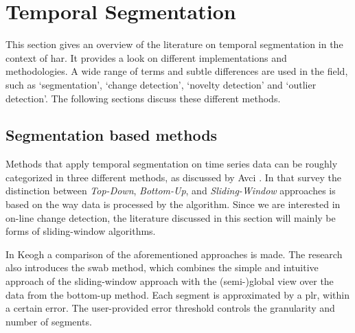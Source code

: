 \section{Temporal Segmentation}\label{sec:literature_review_temporal_segmentation}




This section gives an overview of the literature on temporal segmentation in the context of \gls{har}.
It provides a look on different implementations and methodologies.
A wide range of terms and subtle differences are used in the field, such as `segmentation', `change detection', `novelty detection' and `outlier detection'.
The following sections discuss these different methods.

\subsection{Segmentation based methods}\label{subsec:segmentation}

Methods that apply temporal segmentation on time series data can be roughly categorized in three different methods, as discussed by Avci \etal \cite{avci2010activity}.
In that survey the distinction between \emph{Top-Down}, \emph{Bottom-Up}, and \emph{Sliding-Window} approaches is based on the way data is processed by the algorithm.
Since we are interested in on-line change detection, the literature discussed in this section will mainly be forms of sliding-window algorithms.

In Keogh \etal \cite{keogh2001online} a comparison of the aforementioned approaches is made.
The research also introduces the \gls{swab} method, which combines the simple and intuitive approach of the sliding-window approach with the (semi-)global view over the data from the bottom-up method.
Each segment is approximated by a \gls{plr}, within a certain error.
The user-provided error threshold controls the granularity and number of segments.

